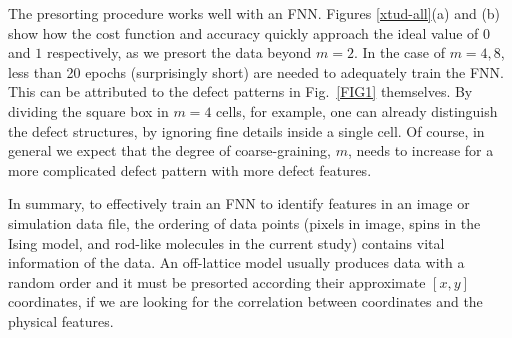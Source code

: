 The presorting procedure works well with an FNN. Figures \ref{xtud-all}(a) and (b) show how the cost function and accuracy quickly approach the ideal value of $0$ and $1$ respectively, as we presort the data beyond $m=2$.
In the case of $m=4, 8$, less than 20 epochs (surprisingly short) are needed to adequately train the FNN. This can be attributed to the defect patterns in Fig.\ \ref{FIG1} themselves. By dividing the square box in $m=4$ cells, for example, one can already distinguish the defect structures, by ignoring fine details inside a single cell.
Of course,  in general we expect that the degree of coarse-graining, $m$, needs to increase for a more complicated defect pattern with more defect features.

In summary, to effectively train an FNN to identify features in an image or simulation data file, the ordering of data points (pixels in image, spins in the Ising model, and rod-like molecules in the current study) contains vital information of the data. An off-lattice model usually produces data with a random order and it must be presorted according their approximate $[x,y]$ coordinates, if we are looking for the correlation between coordinates and the physical features.



